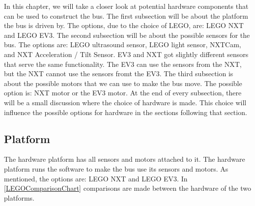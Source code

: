 In this chapter, we will take a closer look at potential hardware components that can be used to construct the bus. The first subsection will be about the platform the bus is driven by. The options, due to the choice of LEGO, are: LEGO NXT and LEGO EV3.
The second subsection will be about the possible sensors for the bus. The options are: LEGO ultrasound sensor, LEGO light sensor, NXTCam\cite{Mindsensors}, and NXT Acceleration / Tilt Sensor\cite{HiTechnic}. EV3 and NXT got slightly different sensors that serve the same functionality. The EV3 can use the sensors from the NXT, but the NXT cannot use the sensors fromt the EV3.
The third subsection is about the possible motors that we can use to make the bus move. The possible option is: NXT motor or the EV3 motor. 
At the end of every subsection, there will be a small discussion where the choice of hardware is made. This choice will influence the possible options for hardware in the sections following that section.

\subsection{Platform}

The hardware platform has all sensors and motors attached to it. The hardware platform runs the software to make the bus use its sensors and motors. As mentioned, the options are: LEGO NXT and LEGO EV3. In \ref{LEGOComparisonChart} comparisons are made between the hardware of the two platforms.


